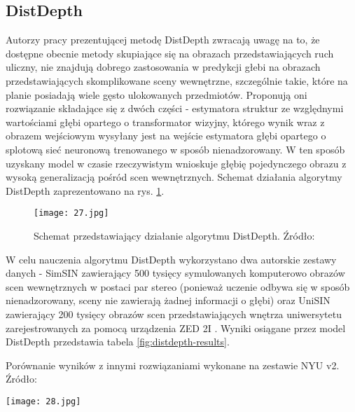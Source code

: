 \subsection{DistDepth}
Autorzy pracy prezentującej metodę DistDepth \cite{wu2022practical} zwracają uwagę na to, że dostępne obecnie metody skupiające się na obrazach przedstawiających ruch uliczny, nie znajdują dobrego zastosowania w predykcji głebi na obrazach przedstawiających skomplikowane sceny wewnętrzne, szczególnie takie, które na planie posiadają wiele gęsto ulokowanych przedmiotów. Proponują oni rozwiązanie składające się z dwóch części - estymatora struktur ze względnymi wartościami głębi opartego o transformator wizyjny, którego wynik wraz z obrazem wejściowym wysyłany jest na wejście estymatora głębi opartego o splotową sieć neuronową trenowanego w sposób nienadzorowany. W ten sposób uzyskany model w czasie rzeczywistym wnioskuje głębię pojedynczego obrazu z wysoką generalizacją pośród scen wewnętrznych. Schemat działania algorytmy DistDepth zaprezentowano na rys. \ref{fig:distdepth-teaser}.
\begin{figure}[H]
    \centering
    \texttt{[image: 27.jpg]}
    \caption{Schemat przedstawiający działanie algorytmu DistDepth. Źródło: \cite{wu2022practical}}
    \label{fig:distdepth-teaser}
\end{figure}
W celu nauczenia algorytmu DistDepth wykorzystano dwa autorskie zestawy danych - SimSIN zawierający 500 tysięcy symulowanych komputerowo obrazów scen wewnętrznych w postaci par stereo (ponieważ uczenie odbywa się w sposób nienadzorowany, sceny nie zawierają żadnej informacji o głębi) oraz UniSIN zawierający 200 tysięcy obrazów scen przedstawiających wnętrza uniwersytetu zarejestrowanych za pomocą urządzenia ZED 2I \cite{ZED2I}. Wyniki osiągane przez model DistDepth przedstawia tabela \ref{fig:distdepth-results}.
\begin{table}[H]
    \centering
    \caption{Porównanie wyników z innymi rozwiązaniami wykonane na zestawie NYU v2. Źródło: \cite{wu2022practical}}
    \texttt{[image: 28.jpg]}
    \label{fig:distdepth-results}
\end{table}

